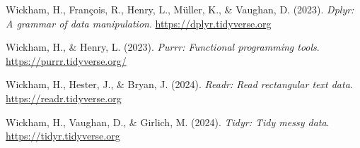 \documentclass[
]{article}
\newlength{\cslhangindent}
\newlength{\cslentryspacingunit} %
\newenvironment{CSLReferences}[2] %
 {%
  \setlength{\parindent}{0pt}
  \ifodd #1
  \let\oldpar\par
  \def\par{\hangindent=\cslhangindent\oldpar}
  \fi
  \setlength{\parskip}{#2\cslentryspacingunit}
 }%
 {}
\begin{document}
\begin{CSLReferences}{1}{0}
\leavevmode{}%
Wickham, H., François, R., Henry, L., Müller, K., \& Vaughan, D. (2023).
\emph{Dplyr: A grammar of data manipulation}.
\url{https://dplyr.tidyverse.org}

\leavevmode{}%
Wickham, H., \& Henry, L. (2023). \emph{Purrr: Functional programming
tools}. \url{https://purrr.tidyverse.org/}

\leavevmode{}%
Wickham, H., Hester, J., \& Bryan, J. (2024). \emph{Readr: Read
rectangular text data}. \url{https://readr.tidyverse.org}

\leavevmode{}%
Wickham, H., Vaughan, D., \& Girlich, M. (2024). \emph{Tidyr: Tidy messy
data}. \url{https://tidyr.tidyverse.org}

\end{CSLReferences}
\end{document}

